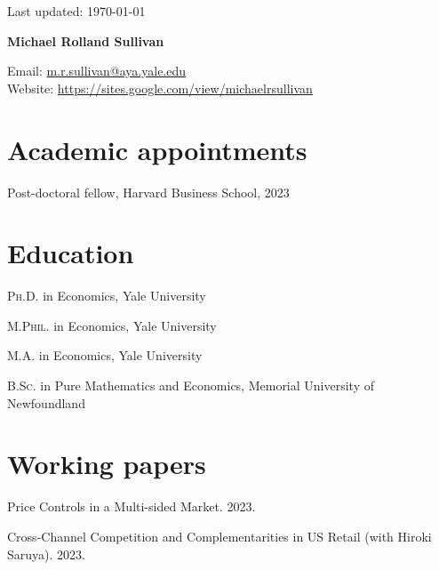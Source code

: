 \documentclass[11pt]{article} %
\begin{document}
 \begin{flushright}
   \scriptsize
	Last updated: \today
   \normalsize
\end{flushright}
{\LARGE\bfseries Michael Rolland Sullivan} %
\bigskip\bigskip\medskip %

\medskip %

Email: \href{mailto:m.r.sullivan@yale.edu}{m.r.sullivan@aya.yale.edu}\\ 
Website: \href{https://sites.google.com/view/michaelrsullivan/home}{https://sites.google.com/view/michaelrsullivan}\\ 

%

\section*{Academic appointments}

Post-doctoral fellow, Harvard Business School, 2023

\section*{Education}

\textsc{Ph.D.} in Economics, Yale University  

\textsc{M.Phil.} in Economics, Yale University 

\textsc{M.A.} in Economics, Yale University 

\textsc{B.Sc.} in Pure Mathematics and Economics, Memorial University of Newfoundland

\section*{Working papers}

Price Controls in a Multi-sided Market. 2023. 

\medskip

Cross-Channel Competition and Complementarities in US Retail
(with Hiroki Saruya). 2023.
\end{document}
